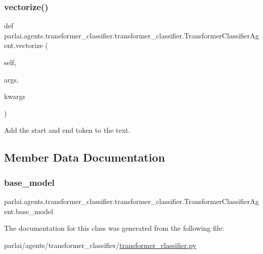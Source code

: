 \subsubsection{\texorpdfstring{vectorize()}{vectorize()}}
{\footnotesize\ttfamily def parlai.\+agents.\+transformer\+\_\+classifier.\+transformer\+\_\+classifier.\+Transformer\+Classifier\+Agent.\+vectorize (\begin{DoxyParamCaption}\item[{}]{self,  }\item[{}]{args,  }\item[{}]{kwargs }\end{DoxyParamCaption})}

\begin{DoxyVerb}Add the start and end token to the text.
\end{DoxyVerb}
 

\subsection{Member Data Documentation}
\mbox{\label{classparlai_1_1agents_1_1transformer__classifier_1_1transformer__classifier_1_1TransformerClassifierAgent_a9893f246ed245dd63751b31e1ce9b8ef}} 
\subsubsection{\texorpdfstring{base\+\_\+model}{base\_model}}
{\footnotesize\ttfamily parlai.\+agents.\+transformer\+\_\+classifier.\+transformer\+\_\+classifier.\+Transformer\+Classifier\+Agent.\+base\+\_\+model}



The documentation for this class was generated from the following file\+:\begin{DoxyCompactItemize}
\item 
parlai/agents/transformer\+\_\+classifier/\hyperlink{transformer__classifier_8py}{transformer\+\_\+classifier.\+py}\end{DoxyCompactItemize}
